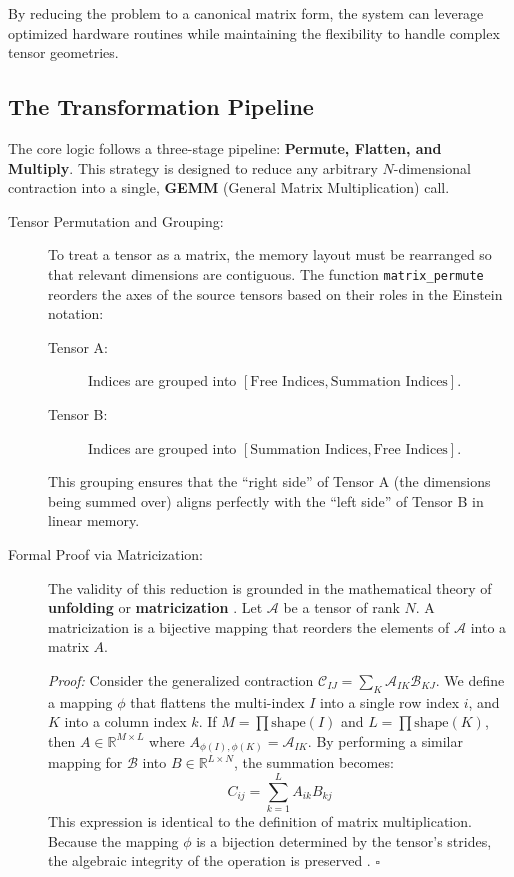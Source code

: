 \documentclass[binding=0.6cm]{sapthesis}
\begin{document}
By reducing the problem to a canonical matrix form, the system can leverage optimized hardware routines while maintaining the flexibility to handle complex tensor geometries.

\subsection{The Transformation Pipeline}

The core logic follows a three-stage pipeline: \textbf{Permute, Flatten, and Multiply}. This strategy is designed to reduce any arbitrary $N$-dimensional contraction into a single, \textbf{GEMM} (General Matrix Multiplication) call.

\begin{description}
	\item [Tensor Permutation and Grouping:] To treat a tensor as a matrix, the memory layout must be rearranged so that relevant dimensions are contiguous. The function \texttt{matrix\_permute} reorders the axes of the source tensors based on their roles in the Einstein notation:
	      \begin{description}
		      \item [Tensor A:] Indices are grouped into $[ \text{Free Indices}, \text{Summation Indices} ]$.
		      \item [Tensor B:] Indices are grouped into $[ \text{Summation Indices}, \text{Free Indices} ]$.
	      \end{description}
	      This grouping ensures that the ``right side'' of Tensor A (the dimensions being summed over) aligns perfectly with the ``left side'' of Tensor B in linear memory.

	\item [Formal Proof via Matricization:] The validity of this reduction is grounded in the mathematical theory of \textbf{unfolding} or \textbf{matricization} \cite{kolda2009tensor}. Let $\mathcal{A}$ be a tensor of rank $N$. A matricization is a bijective mapping that reorders the elements of $\mathcal{A}$ into a matrix $A$.

	      \textit{Proof:} Consider the generalized contraction $\mathcal{C}_{IJ} = \sum_{K} \mathcal{A}_{IK} \mathcal{B}_{KJ}$. We define a mapping $\phi$ that flattens the multi-index $I$ into a single row index $i$, and $K$ into a column index $k$. If $M = \prod \text{shape}(I)$ and $L = \prod \text{shape}(K)$, then $A \in \mathbb{R}^{M \times L}$ where $A_{\phi(I), \phi(K)} = \mathcal{A}_{IK}$. By performing a similar mapping for $\mathcal{B}$ into $B \in \mathbb{R}^{L \times N}$, the summation becomes:
	      \begin{equation}
		      C_{ij} = \sum_{k=1}^{L} A_{ik} B_{kj}
	      \end{equation}
	      This expression is identical to the definition of matrix multiplication. Because the mapping $\phi$ is a bijection determined by the tensor's strides, the algebraic integrity of the operation is preserved \cite{roberts2020einsum}. $\square$


\end{description}
\end{document}
